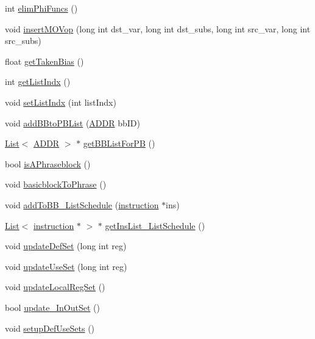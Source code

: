 \begin{DoxyCompactItemize}
int \hyperlink{classbasicblock_a27c168ce65c2d5ead06682ea41af8473}{elimPhiFuncs} ()
\item 
void \hyperlink{classbasicblock_a85e079721ac3397044a6148e4d5fc688}{insertMOVop} (long int dst\_\-var, long int dst\_\-subs, long int src\_\-var, long int src\_\-subs)
\item 
float \hyperlink{classbasicblock_afdffc2f38dc3e93c9125a1e4d205f4e9}{getTakenBias} ()
\item 
int \hyperlink{classbasicblock_a17c48156a5eefea6d8ca831dced719e3}{getListIndx} ()
\item 
void \hyperlink{classbasicblock_a1d85d5fd059f1658ce3c67357502ed71}{setListIndx} (int listIndx)
\item 
void \hyperlink{classbasicblock_ab20f99e31cfc155ec00b9027f9c3d454}{addBBtoPBList} (\hyperlink{binaryTranslator_2global_8h_aa4557b0650cb21e57e3e4623410832c6}{ADDR} bbID)
\item 
\hyperlink{classList}{List}$<$ \hyperlink{binaryTranslator_2global_8h_aa4557b0650cb21e57e3e4623410832c6}{ADDR} $>$ $\ast$ \hyperlink{classbasicblock_a4a68932d0628e028f4c5877cb888654c}{getBBListForPB} ()
\item 
bool \hyperlink{classbasicblock_a88276960d345d6849dbe02c9debbb94e}{isAPhraseblock} ()
\item 
void \hyperlink{classbasicblock_af48f1b1d1c2618185cf63aa36098092c}{basicblockToPhrase} ()
\item 
void \hyperlink{classbasicblock_abb72488dac0d405735a4cf82a1cdd0ce}{addToBB\_\-ListSchedule} (\hyperlink{classinstruction}{instruction} $\ast$ins)
\item 
\hyperlink{classList}{List}$<$ \hyperlink{classinstruction}{instruction} $\ast$ $>$ $\ast$ \hyperlink{classbasicblock_a87440b1ddb945365a4d32b356756ae24}{getInsList\_\-ListSchedule} ()
\item 
void \hyperlink{classbasicblock_aa30a3590075a3c30fa5406e3cf81a2e1}{updateDefSet} (long int reg)
\item 
void \hyperlink{classbasicblock_a13aad72bd6dce3b9d6fd47dd324504d3}{updateUseSet} (long int reg)
\item 
void \hyperlink{classbasicblock_abae11bf0376749457259a6d2a2ef8fe7}{updateLocalRegSet} ()
\item 
bool \hyperlink{classbasicblock_af543b2aba60aec6408825fe513736a8d}{update\_\-InOutSet} ()
\item 
void \hyperlink{classbasicblock_a828499c93c05d54ff789feed38051428}{setupDefUseSets} ()
\item 

\end{DoxyCompactItemize}
